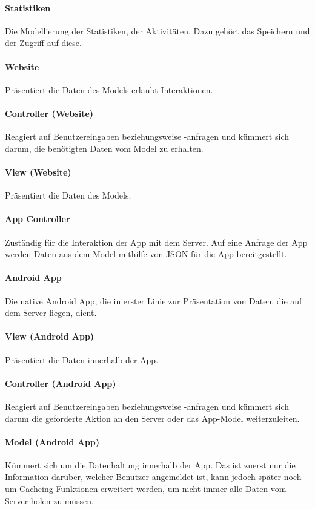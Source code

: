 \paragraph{Statistiken} Die Modellierung der Statistiken, der Aktivitäten. Dazu gehört das Speichern und der Zugriff auf diese.

\paragraph{Website} Präsentiert die Daten des Models erlaubt Interaktionen.

\paragraph{Controller (Website)} Reagiert auf Benutzereingaben beziehungsweise -anfragen und kümmert sich darum, die benötigten Daten vom Model zu erhalten.

\paragraph{View (Website)} Präsentiert die Daten des Models.

\paragraph{App Controller} Zuständig für die Interaktion der App mit dem Server. Auf eine Anfrage der App werden Daten aus dem Model mithilfe von JSON für die App bereitgestellt.

\paragraph{Android App} Die native Android App, die in erster Linie zur Präsentation von Daten, die auf dem Server liegen, dient.

\paragraph{View (Android App)} Präsentiert die Daten innerhalb der App.

\paragraph{Controller (Android App)} Reagiert auf Benutzereingaben beziehungsweise -anfragen und kümmert sich darum die geforderte Aktion an den Server oder das App-Model weiterzuleiten.

\paragraph{Model (Android App)} Kümmert sich um die Datenhaltung innerhalb der App. Das ist zuerst nur die Information darüber, welcher Benutzer angemeldet ist, kann jedoch später noch um Cacheing-Funktionen erweitert werden, um nicht immer alle Daten vom Server holen zu müssen.

